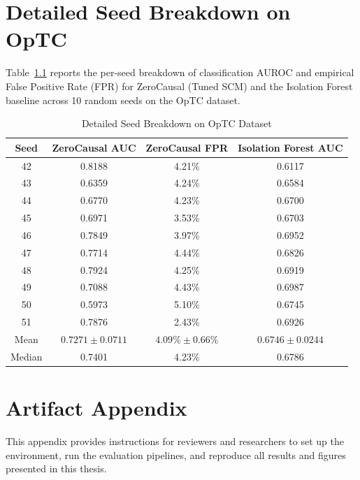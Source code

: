 \appendix

\chapter{Detailed Seed Breakdown on OpTC}
\label{app:seeds}

Table~\ref{tab:seed_breakdown} reports the per-seed breakdown of classification AUROC and empirical False Positive Rate (FPR) for ZeroCausal (Tuned SCM) and the Isolation Forest baseline across 10 random seeds on the OpTC dataset.

\begin{table}[htbp]
\centering
\caption{Detailed Seed Breakdown on OpTC Dataset}
\begin{tabular}{cccc}
\toprule
Seed & ZeroCausal AUC & ZeroCausal FPR & Isolation Forest AUC \\
\midrule
42 & 0.8188 & 4.21\% & 0.6117 \\
43 & 0.6359 & 4.24\% & 0.6584 \\
44 & 0.6770 & 4.23\% & 0.6700 \\
45 & 0.6971 & 3.53\% & 0.6703 \\
46 & 0.7849 & 3.97\% & 0.6952 \\
47 & 0.7714 & 4.44\% & 0.6826 \\
48 & 0.7924 & 4.25\% & 0.6919 \\
49 & 0.7088 & 4.43\% & 0.6987 \\
50 & 0.5973 & 5.10\% & 0.6745 \\
51 & 0.7876 & 2.43\% & 0.6926 \\
\midrule
Mean & $0.7271 \pm 0.0711$ & $4.09\% \pm 0.66\%$ & $0.6746 \pm 0.0244$ \\
Median & 0.7401 & 4.23\% & 0.6786 \\
\bottomrule
\end{tabular}
\label{tab:seed_breakdown}
\end{table}


\chapter{Artifact Appendix}
\label{app:artifact}

This appendix provides instructions for reviewers and researchers to set up the environment, run the evaluation pipelines, and reproduce all results and figures presented in this thesis.


